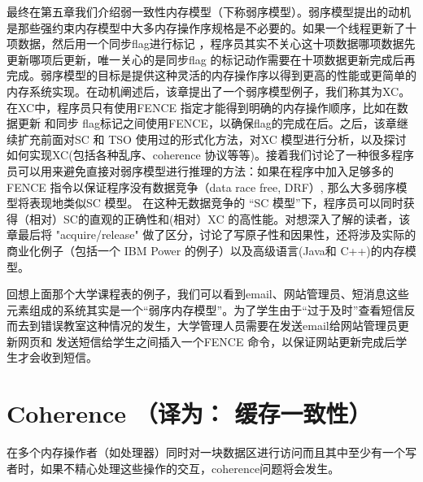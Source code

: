 \documentclass[UTF-8]{ctexbook}
\begin{document}
\par 最终在第五章我们介绍弱一致性内存模型（下称弱序模型）。弱序模型提出的动机是那些强约束内存模型中大多内存操作序规格是不必要的。如果一个线程更新了十项数据，然后用一个同步flag进行标记 ，程序员其实不关心这十项数据哪项数据先更新哪项后更新，唯一关心的是同步flag 的标记动作需要在十项数据更新完成后再完成。弱序模型的目标是提供这种灵活的内存操作序以得到更高的性能或更简单的内存系统实现。在动机阐述后，该章提出了一个弱序模型例子，我们称其为XC。在XC中，程序员只有使用FENCE 指定才能得到明确的内存操作顺序，比如在数据更新 和同步 flag标记之间使用FENCE，以确保flag的完成在后。之后，该章继续扩充前面对SC 和 TSO 使用过的形式化方法，对XC 模型进行分析，以及探讨如何实现XC(包括各种乱序、coherence 协议等等)。接着我们讨论了一种很多程序员可以用来避免直接对弱序模型进行推理的方法：如果在程序中加入足够多的FENCE 指令以保证程序没有数据竞争（data race free, DRF）, 那么大多弱序模型将表现地类似SC 模型。 在这种无数据竞争的 “SC 模型”下，程序员可以同时获得（相对）SC的直观的正确性和(相对）XC 的高性能。对想深入了解的读者，该章最后将 "acquire/release" 做了区分，讨论了写原子性和因果性，还将涉及实际的商业化例子（包括一个 IBM Power 的例子）以及高级语言(Java和 C++)的内存模型。
\par 回想上面那个大学课程表的例子，我们可以看到email、网站管理员、短消息这些元素组成的系统其实是一个“弱序内存模型”。为了学生由于“过于及时”查看短信反而去到错误教室这种情况的发生，大学管理人员需要在发送email给网站管理员更新网页和 发送短信给学生之间插入一个FENCE 命令，以保证网站更新完成后学生才会收到短信。
\section{Coherence （译为： 缓存一致性）}
在多个内存操作者（如处理器）同时对一块数据区进行访问而且其中至少有一个写者时，如果不精心处理这些操作的交互，coherence问题将会发生。















 
\end{document}
